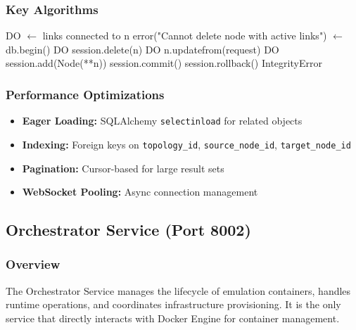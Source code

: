 \documentclass[10pt,a4paper]{article}
\begin{document}
\subsubsection{Key Algorithms}

\begin{algorithm}
\caption{Atomic Topology Change Application}
\begin{algorithmic}[H]
 DO
     $\leftarrow$ links connected to n
     \THEN
        \RETURN error("Cannot delete node with active links")
    \ENDIF
\ENDFOR
{} $\leftarrow$ db.begin()
\TRY
     DO
        session.delete(n)
    \ENDFOR
     DO
        n.updatefrom(request)
    \ENDFOR
     DO
        session.add(Node(**n))
    \ENDFOR
    session.commit()
\CATCH
    session.rollback()
    \RAISE IntegrityError
\ENDTRY
\end{algorithmic}
\end{algorithm}

\subsubsection{Performance Optimizations}
\begin{itemize}
\item \textbf{Eager Loading:} SQLAlchemy \texttt{selectinload} for related objects
\item \textbf{Indexing:} Foreign keys on \texttt{topology\_id}, \texttt{source\_node\_id}, \texttt{target\_node\_id}
\item \textbf{Pagination:} Cursor-based for large result sets
\item \textbf{WebSocket Pooling:} Async connection management
\end{itemize}

\subsection{Orchestrator Service (Port 8002)}

\subsubsection{Overview}
The Orchestrator Service manages the lifecycle of emulation containers, handles runtime operations, and coordinates infrastructure provisioning. It is the only service that directly interacts with Docker Engine for container management.
\end{document}

